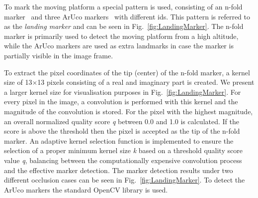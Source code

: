 \documentclass[conference]{IEEEtran}
\begin{document}

To mark the moving platform a special pattern is used,
consisting of an n-fold marker~\cite{NfoldMarker} and three
ArUco markers~\cite{ArUco_marker} with different ids. This pattern
is referred to as the \emph{landing marker} and can be seen in
Fig.~\ref{fig:LandingMarker}. The n-fold marker is primarily used to
detect the moving platform from a high altitude, while the ArUco
markers are used as extra landmarks in case the marker is partially
visible in the image frame.



To extract the pixel coordinates of the tip (center) of the n-fold marker, a
kernel size of \SI{13}{}$\times$\SI{13}{} pixels consisting of a real and imaginary
part is created. We present a larger kernel size for visualisation purposes in Fig.~\ref{fig:LandingMarker}.   For every pixel in the image, a convolution is
performed with this kernel and the magnitude of the convolution is
stored. 
For the pixel with the highest magnitude, 
an
overall normalized quality score \emph{q} between \SI{0.0}{} and \SI{1.0}{} is calculated. If
the score is above the threshold then the pixel is
accepted as the tip of the n-fold marker. 
%
An adaptive kernel selection function is implemented to ensure the selection of a
proper minimum kernel size \emph{k} based on a threshold quality score value \emph{q}, balancing between the computationally expensive convolution process and the effective marker detection. The marker detection results under two different occlusion cases can be seen in Fig.~\ref{fig:LandingMarker}. %
%
To detect the ArUco markers the standard OpenCV library is used. %
\end{document}
